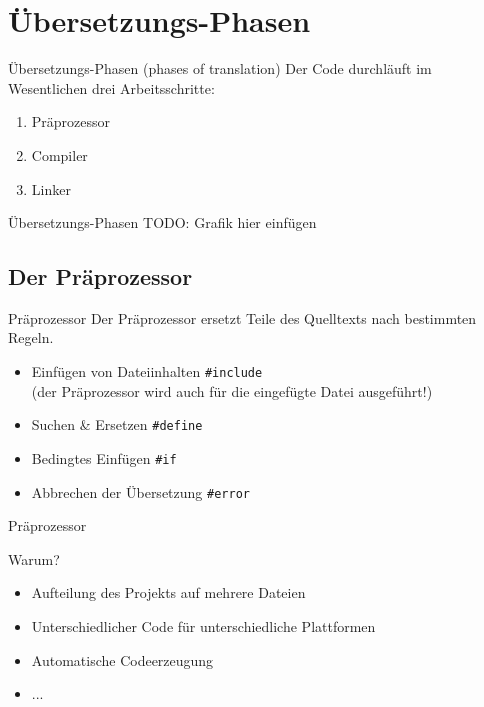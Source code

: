 \section{Übersetzungs-Phasen}


\begin{frame}{Übersetzungs-Phasen (phases of translation)}
	Der Code durchläuft im Wesentlichen drei Arbeitsschritte:
	
	\begin{enumerate}
		\item Präprozessor
		\item Compiler
		\item Linker
	\end{enumerate}
\end{frame}

\begin{frame}[fragile]{Übersetzungs-Phasen}
	TODO: Grafik hier einfügen
\end{frame}

\subsection{Der Präprozessor}

\begin{frame}[fragile]{Präprozessor}
	Der Präprozessor ersetzt Teile des Quelltexts nach bestimmten Regeln.
	
	\vspace{2em}
	
	\begin{itemize}
		\item Einfügen von Dateiinhalten \verb|#include| \\
		      (der Präprozessor wird auch für die eingefügte Datei ausgeführt!)
		\item Suchen \& Ersetzen \verb|#define|
		\item Bedingtes Einfügen \verb|#if|
		\item Abbrechen der Übersetzung \verb|#error|
	\end{itemize}
\end{frame}

\begin{frame}{Präprozessor}
	\begin{block}{Warum?}
		\begin{itemize}
			\item Aufteilung des Projekts auf mehrere Dateien
			\item Unterschiedlicher Code für unterschiedliche Plattformen
			\item Automatische Codeerzeugung
			\item ...
		\end{itemize}
	\end{block}
\end{frame}

